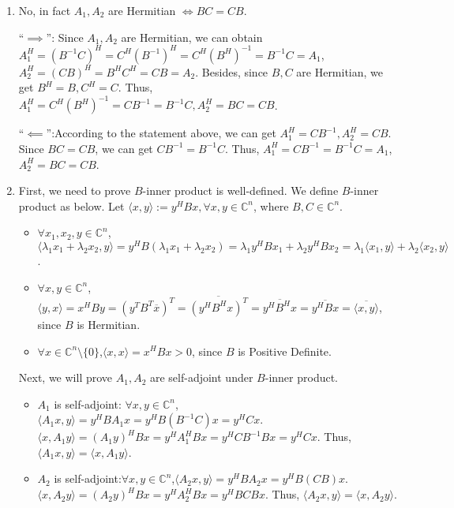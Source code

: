 \documentclass{ctexart}
\begin{document}
\begin{solution}
  \begin{enumerate}
    \item No, in fact \(A_1, A_2 \) are Hermitian \(\iff BC=CB \).

      ``\(\implies\)'': Since \(A_1,A_2 \) are Hermitian, we can obtain 
      \(A_1^H=(B^{-1}C)^H=C^H(B^{-1})^H=C^H(B^H)^{-1} =B^{-1}C=A_1\), 
      \(A_2^H=(CB)^H=B^HC^H =CB=A_2\). Besides, since \(B,C \) are Hermitian, we 
      get \(B^H=B,C^H=C \). Thus, \(A_1^H=C^H(B^H)^{-1}=CB^{-1}=B^{-1}C,A_2^H=BC =CB\).

      ``\(\impliedby\)'':According to the statement above, we can get 
      \(A_1^H=CB^{-1},A_2^H=CB \). Since \(BC=CB \), we can get 
      \(CB^{-1}=B^{-1}C \). Thus, \(A_1^H=CB^{-1} = B^{-1}C=A_1\), \(A_2^H=BC=CB \).
    \item First, we need to prove \(B \)-inner product is well-defined.
      We define \(B \)-inner product as below. 
      Let \(\langle x,y\rangle:=y^HBx, \forall x,y \in \mathbb{C}^n  \), where \(B,C \in \mathbb{C}^n \).
      \begin{itemize}
        \item \(\forall x_1,x_2, y \in \mathbb{C}^n \), \(\langle \lambda_1 x_1 + \lambda_2 x_2 ,y\rangle =y^HB(\lambda_{1}x_1 + \lambda_2 x_2)=\lambda_1y^H B x_1 + \lambda_2 y^H B x_2 =
          \lambda_1 \langle x_1,y\rangle + \lambda_2\langle x_2,y\rangle\).
        \item \(\forall x,y \in \mathbb{C}^n \),\(\langle y,x \rangle =x^HBy=(y^T B^T \overline{x})^T=\overline{(y^HB^Hx)^T}=\overline{y^HB^Hx}=\overline{y^HBx}=\overline{\langle x,y\rangle }\), 
          since \(B \) is Hermitian.
        \item \(\forall x \in \mathbb{C}^n \setminus \{0\} \),\(\langle x,x\rangle =x^HBx>0 \), since \(B \) is Positive Definite. 
      \end{itemize}
     Next, we will prove \(A_1,A_2 \) are self-adjoint under \(B \)-inner product.
     \begin{itemize}
       \item \(A_1 \) is self-adjoint: \(\forall x,y \in \mathbb{C}^n \), \(\langle A_1x,y\rangle =y^HBA_1x =y^HB(B^{-1}C)x=y^HCx\). 
         \(\langle x,A_1y\rangle =(A_1y)^HBx=y^HA_1^HBx=y^HCB^{-1}Bx=y^HCx \). Thus, \(\langle A_1x,y\rangle =\langle x,A_1y\rangle  \).
       \item \(A_2 \) is self-adjoint:\( \forall x,y \in \mathbb{C}^n\),\(\langle A_2x,y\rangle =y^HBA_2x=y^HB(CB)x \).
         \(\langle x,A_2y\rangle =(A_2y)^HBx=y^HA_2^HBx=y^HBCBx \). Thus, \(\langle A_2x,y\rangle =\langle x,A_2y\rangle  \).
     \end{itemize}
  \end{enumerate}
\end{solution}
\end{document}
